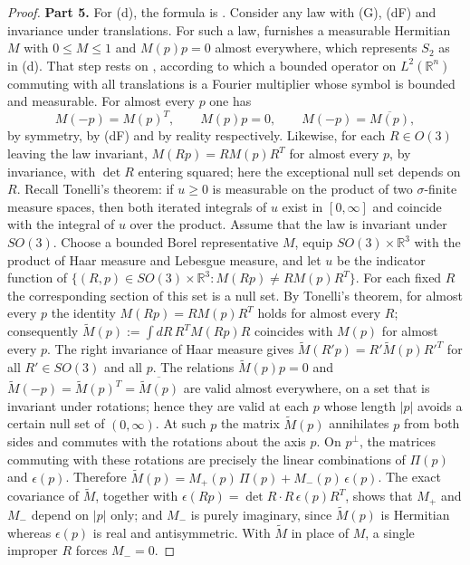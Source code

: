 \documentclass[11pt]{amsart}
\theoremstyle{definition}
\begin{document}
\begin{proof}
\textbf{Part 5.}
For (d), the formula is \cite[Theorem~44\,(D2) with (C7)]{QEDIII}.
Consider any law with (G), (dF) and invariance under translations.
For such a law, \cite[proof of Theorem~14.26, Step~7]{QEDII} furnishes a measurable Hermitian $M$ with $0\le M\le1$ and $M(p)p=0$ almost everywhere, which represents $S_2$ as in (d).
That step rests on \cite[Chapter~I, Theorem~3.18]{SteinWeiss1971}, according to which a bounded operator on $L^2(\mathbb R^n)$ commuting with all translations is a Fourier multiplier whose symbol is bounded and measurable.
For almost every $p$ one has
\begin{equation*}
M(-p)=M(p)^T,\qquad M(p)p=0,\qquad M(-p)=\overline{M(p)},
\end{equation*}
by symmetry, by (dF) and by reality respectively.
Likewise, for each $R\in O(3)$ leaving the law invariant, $M(Rp)=RM(p)R^T$ for almost every $p$, by invariance, with $\det R$ entering squared; here the exceptional null set depends on $R$.
Recall Tonelli's theorem: if $u\ge0$ is measurable on the product of two $\sigma$-finite measure spaces, then both iterated integrals of $u$ exist in $[0,\infty]$ and coincide with the integral of $u$ over the product.
Assume that the law is invariant under $SO(3)$.
Choose a bounded Borel representative $M$, equip $SO(3)\times\mathbb R^3$ with the product of Haar measure and Lebesgue measure, and let $u$ be the indicator function of $\{(R,p)\in SO(3)\times\mathbb R^3:M(Rp)\ne RM(p)R^T\}$.
For each fixed $R$ the corresponding section of this set is a null set.
By Tonelli's theorem, for almost every $p$ the identity $M(Rp)=RM(p)R^T$ holds for almost every $R$; consequently $\tilde M(p):=\int dR\,R^TM(Rp)R$ coincides with $M(p)$ for almost every $p$.
The right invariance of Haar measure gives $\tilde M(R'p)=R'\tilde M(p)R'^T$ for all $R'\in SO(3)$ and all $p$.
The relations $\tilde M(p)p=0$ and $\tilde M(-p)=\tilde M(p)^T=\overline{\tilde M(p)}$ are valid almost everywhere, on a set that is invariant under rotations; hence they are valid at each $p$ whose length $|p|$ avoids a certain null set of $(0,\infty)$.
At such $p$ the matrix $\tilde M(p)$ annihilates $p$ from both sides and commutes with the rotations about the axis $p$.
On $p^\perp$, the matrices commuting with these rotations are precisely the linear combinations of $\Pi(p)$ and $\epsilon(p)$.
Therefore $\tilde M(p)=M_+(p)\,\Pi(p)+M_-(p)\,\epsilon(p)$.
The exact covariance of $\tilde M$, together with $\epsilon(Rp)=\det R\cdot R\,\epsilon(p)R^T$, shows that $M_+$ and $M_-$ depend on $|p|$ only; and $M_-$ is purely imaginary, since $\tilde M(p)$ is Hermitian whereas $\epsilon(p)$ is real and antisymmetric.
With $\tilde M$ in place of $M$, a single improper $R$ forces $M_-=0$.


\end{proof}
\end{document}

